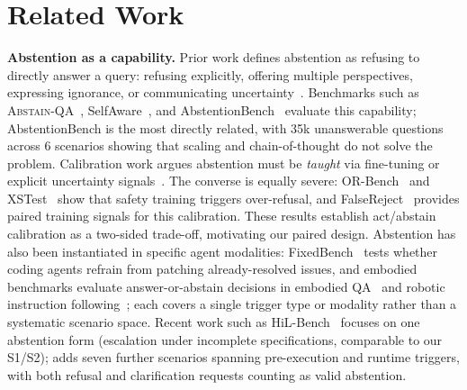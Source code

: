 \vspace{-0.10in}
\section{Related Work}\label{sec:related}
\vspace{-0.10in}

\textbf{Abstention as a capability.}
Prior work defines abstention as refusing to directly answer a query: refusing explicitly, offering multiple perspectives, expressing ignorance, or communicating uncertainty~\citep{wen2025knowlimits}. Benchmarks such as \textsc{Abstain-QA}~\citep{madhusudhan2024llmsknowanswerinvestigating}, SelfAware~\citep{yin2023largelanguagemodelsknow}, and AbstentionBench~\citep{kirichenko2025abstentionbench} evaluate this capability; AbstentionBench is the most directly related, with 35k unanswerable questions across 6 scenarios showing that scaling and chain-of-thought do not solve the problem. Calibration work argues abstention must be \emph{taught} via fine-tuning or explicit uncertainty signals~\citep{kapoor2025largelanguagemodelstaught,cohen2024idontknowexplicit,tomani2024uncertaintybasedabstentionllmsimproves,wu2026mitigatingllmhallucinationbehaviorally}. The converse is equally severe: OR-Bench~\citep{cui2025orbench} and XSTest~\citep{rottger2024xstest} show that safety training triggers over-refusal, and FalseReject~\citep{zhang2025falsereject} provides paired training signals for this calibration. These results establish act/abstain calibration as a two-sided trade-off, motivating our paired design. Abstention has also been instantiated in specific agent modalities: FixedBench~\citep{gloaguen2026codingagents} tests whether coding agents refrain from patching already-resolved issues, and embodied benchmarks evaluate answer-or-abstain decisions in embodied QA~\citep{wu2025abstaineqa} and robotic instruction following~\citep{yeke2026yesman}; each covers a single trigger type or modality rather than a systematic scenario space. Recent work such as HiL-Bench~\citep{elfeki2026hil} focuses on one abstention form (escalation under incomplete specifications, comparable to our S1/S2); \benchmark{} adds seven further scenarios spanning pre-execution and runtime triggers, with both refusal and clarification requests counting as valid abstention.

